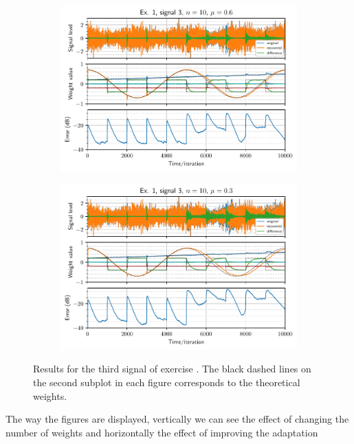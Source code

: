 \begin{figure}[h]
\begin{subfigure}[t]{0.30\columnwidth}
        \includegraphics[width=\columnwidth]{figures/pdf/ex1_l3_n10_mu60.pdf}
        \caption{}
    \end{subfigure} \hfill
    \begin{subfigure}[t]{0.30\columnwidth}
        \centering
        \includegraphics[width=\columnwidth]{figures/pdf/ex1_l3_n10_mu30.pdf}
        \caption{\label{fig:ex1vsig3n10mu3}}
    \end{subfigure}
    \caption{Results for the third signal of exercise . The black dashed lines on
        the second subplot in each figure corresponds to the theoretical weights.
        \label{fig:ex1vsig3}}
\end{figure}
The way the figures are displayed, vertically we can see the effect of changing
the number of weights and horizontally the effect of improving the adaptation
